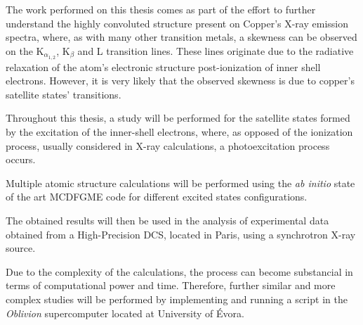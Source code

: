 

%

The work performed on this thesis comes as part of the effort to further understand the highly convoluted structure present on Copper's X-ray emission spectra, where, as with many other transition metals, a skewness can be observed on the K$_{\alpha_{1,2}}$, K$_{\beta}$ and L transition lines. These lines originate due to the radiative relaxation of the atom's electronic structure post-ionization of inner shell electrons.
However, it is very likely that the observed skewness is due to copper's satellite states' transitions.

Throughout this thesis, a study will be performed for the satellite states formed by the excitation of the inner-shell electrons, where, as opposed of the ionization process, usually considered in X-ray calculations, a photoexcitation process occurs.

 Multiple atomic structure calculations will be performed using the \textit{ab initio} state of the art \gls{MCDFGME} code for different excited states configurations.

 The obtained results will then be used in the analysis of experimental data obtained from a High-Precision \gls{DCS}, located in Paris, using a synchrotron X-ray source.

Due to the complexity of the calculations, the process can become substancial in terms of computational power and time. Therefore, further similar and more complex studies will be performed by implementing and running a script in the \textit{Oblivion} supercomputer located at University of Évora.

